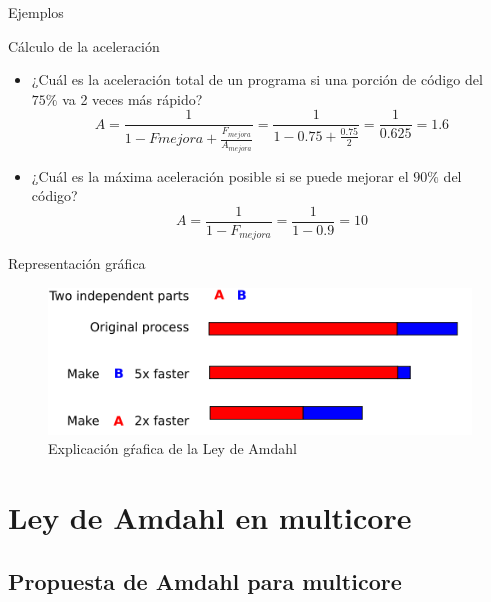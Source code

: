 \documentclass[utf8]{beamer}
\begin{document}
\begin{frame}[allowframebreaks]{Ejemplos}
    \begin{block}{Cálculo de la aceleración}
        \begin{itemize}
        \item ¿Cuál es la aceleración total de un programa si una porción de código del $75\%$ va 2 veces más rápido?
        $$ A = \frac{1}{1-F{mejora}+\frac{F_{mejora}}{A_{mejora}}} = \frac{1}{1 - 0.75 + \frac{0.75}{2}} = \frac{1}{0.625} = 1.6 $$
        \item ¿Cuál es la máxima aceleración posible si se puede mejorar el $90\%$ del código?
        $$ A = \frac{1}{1 - F_{mejora}} = \frac{1}{1 - 0.9} = 10 $$
        \end{itemize}
    \end{block}
    \begin{block}{Representación gráfica}
        \begin{figure}[htp]
            \begin{center}
            \includegraphics[width=.7\linewidth]{figures/amdahl}
            \caption{Explicación gŕafica de la Ley de Amdahl}
            \label{fig:amdahl}
            \end{center}
        \end{figure}
    \end{block}
\end{frame}

\section{Ley de Amdahl en multicore}

\subsection*{Propuesta de Amdahl para multicore}
\end{document}
